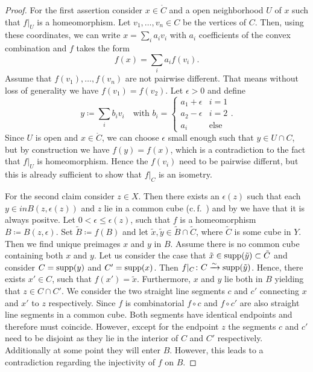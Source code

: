 \begin{proof}
  For the first assertion consider \(x \in \mathring{C}\) and a open neighborhood \(U\) of \(x\) such that \(f|_U\) is a homeomorphism. Let \(v_1, \dots, v_n \in C\) be the vertices of \(C\). Then, using these coordinates, we can write \(x = \sum_i a_i v_i\) with \(a_i\) coefficients of the convex combination and \(f\) takes the form
  \[
    f(x) = \sum_i a_i f(v_i).
  \]
  Assume that \(f(v_1), \dots, f(v_n)\) are not pairwise different. That means without loss of generality we have \(f(v_1) = f(v_2)\). Let \(\epsilon > 0\) and define
  \[
    y \coloneqq \sum_i b_i v_i \quad \text{with } b_i = \begin{cases}a_1 + \epsilon & i = 1\\a_2 - \epsilon & i = 2\\ a_i & \text{else}\end{cases}.
  \]
  Since \(U\) is open and \(x \in \mathring{C}\), we can choose \(\epsilon\) small enough such that \(y \in U \cap C\), but by construction we have \(f(y) = f(x)\), which is a contradiction to the fact that \(f|_U\) is homeomorphism. Hence the \(f(v_i)\) need to be pairwise differnt, but this is already sufficient to show that \(f|_C\) is an isometry.

  For the second claim consider \(z \in X\). Then there exists an \(\epsilon(z)\) such that each \(y \in in B(z, \epsilon(z))\) and \(z\) lie in a common cube (c.\,f.~\cite[I.7.8-9]{MR1744486}) and by \textcite[I.7.33]{MR1744486} we have that it is always positve. Let \(0 < \epsilon \leq \epsilon(z)\), such that \(f\) is a homeomorphism \(B \coloneqq B(z, \epsilon)\). Set \(\tilde B \coloneqq f(B)\) and let \(\tilde x, \tilde y \in \tilde B \cap \tilde C\), where \(\tilde C\) is some cube in \(Y\). Then we find unique preimages \(x\) and \(y\) in \(B\).
  Assume there is no common cube containing both \(x\) and \(y\).
  Let us consider the case that \(\tilde x \in \operatorname{supp}(\tilde y) \subset \tilde C\) and consider \(C = \operatorname{supp}(y)\) and \(C' = \operatorname{supp}(x)\). Then \(f|_C\colon C \xrightarrow{\sim} \operatorname{supp}(\tilde y)\). Hence, there exists \(x' \in C\), such that \(f(x') = \tilde x\). Furthermore, \(x\) and \(y\) lie both in \(B\) yielding that \(z \in C \cap C'\). We consider the two straight line segments \(c\) and \(c'\) connecting \(x\) and \(x'\) to \(z\) respectively. Since \(f\) is combinatorial \(f \circ c\) and \(f \circ c'\) are also straight line segments in a common cube. Both segments have identical endpoints and therefore must coincide. However, except for the endpoint \(z\) the segments \(c\) and \(c'\) need to be disjoint as they lie in the interior of \(C\) and \(C'\) respectively. Additionally at some point they will enter \(B\). However, this leads to a contradiction regarding the injectivity of \(f\) on \(B\).


\end{proof}
